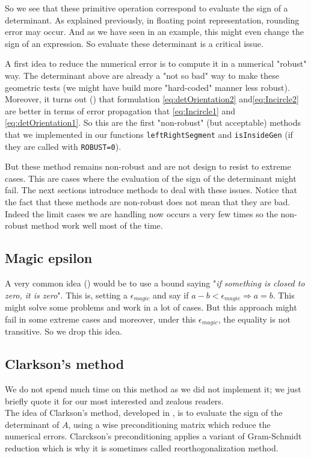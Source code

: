 So we see that these primitive operation correspond to evaluate the sign of a determinant. As explained previously, in floating point representation, rounding error may occur. And as we have seen in an example, this might even change the sign of an expression. So evaluate these determinant is a critical issue.

A first idea to reduce the numerical error is to compute it in a numerical "robust" way. The determinant above are already a "not so bad" way to make these geometric tests (we might have build more "hard-coded" manner less robust). Moreover, it turns out (\cite{shewchuk1996robust}) that formulation \eqref{eq:detOrientation2} and\eqref{eq:Incircle2} are better in terms of error propagation that \eqref{eq:Incircle1} and \eqref{eq:detOrientation1}.
So this are the first "non-robust" (but acceptable) methods that we implemented in our functions \texttt{leftRightSegment} and \texttt{isInsideGen} (if they are called with \texttt{ROBUST=0}).

But these method remains non-robust and are not design to resist to extreme cases. This are cases where the evaluation of the sign of the determinant might fail. The next sections introduce methods to deal with these issues. Notice that the fact that these methods are non-robust does not mean that they are bad. Indeed the limit cases we are handling now occurs a very few times so the non-robust method work well most of the time. 

\subsection{Magic epsilon}
A very common idea (\cite{schirra}) would be to use a bound saying "\textit{if something is closed to zero, it is zero}". This is, setting a $\epsilon _{magic}$ and say if $a-b<\epsilon _{magic} \Rightarrow a=b$. This might solve some problems and work in a lot of cases. But this approach might fail in some extreme cases and moreover, under this $\epsilon_{magic}$, the equality is not transitive. So we drop this idea.
  
\subsection{Clarkson's method}
We do not spend much time on this method as we did not implement it; we just briefly quote it for our most interested and zealous readers.\\
The idea of Clarkson's method, developed in \cite{bronnimann2000efficient}, is to evaluate the sign of the determinant of $A$, using a wise preconditioning matrix which reduce the numerical errors. Clarckson's preconditioning applies a variant of Gram-Schmidt reduction which is why it is sometimes called reorthogonalization method.


